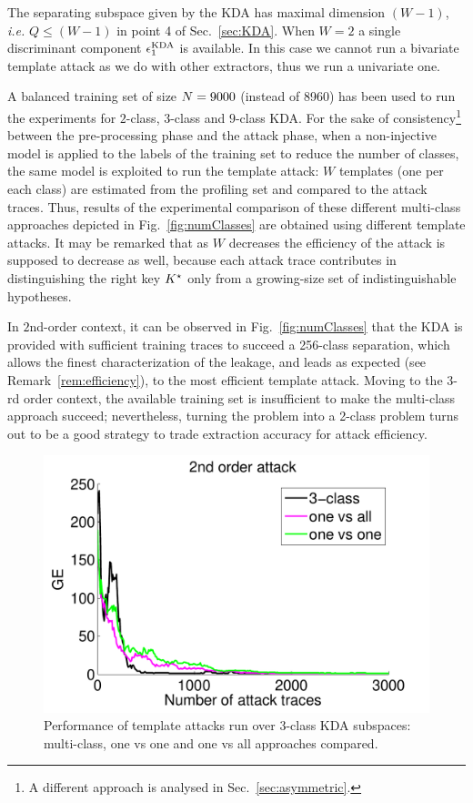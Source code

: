 \begin{remark}\label{rem:numComp}
The separating subspace given by the KDA has maximal dimension $(W-1)$, \emph{i.e.} $Q\leq (W-1)$ in point 4 of Sec.~\ref{sec:KDA}. When $W=2$ a single discriminant component $\epsilon^{\mathrm{KDA}}_1$ is available. In this case we cannot run a bivariate template attack as we do with other extractors, thus we run a univariate one. \\
\end{remark}


A balanced training set of size $N=9000$ (instead of 8960) has been used to run the experiments for $2$-class, $3$-class and $9$-class KDA. For the sake of consistency\footnote{A different approach is analysed in Sec.~\ref{sec:asymmetric}.} between the pre-processing phase and the attack phase, when a non-injective model is applied to the labels of the training set to reduce the number of classes, the same model is exploited to run the template attack: $W$ templates (one per each class) are estimated from the profiling set and compared to the attack traces. Thus, results of the experimental comparison of these different multi-class approaches depicted in  Fig.~\ref{fig:numClasses} are obtained using different template attacks. It may be remarked that as $W$ decreases the efficiency of the attack is supposed to decrease as well, because each attack trace contributes in distinguishing the right key $K^\star$ only from a growing-size set of indistinguishable hypotheses. 


 
In $2$nd-order context, it can be observed in Fig.~\ref{fig:numClasses} that the KDA is provided with sufficient training traces to succeed a 256-class separation, which allows the finest characterization of the leakage, and leads as expected (see Remark~\ref{rem:efficiency}), to the most efficient template attack. Moving to the $3$-rd order context, the available training set is insufficient to make the multi-class approach succeed; nevertheless, turning the problem into a 2-class problem turns out to be a good strategy to trade extraction accuracy for attack efficiency.






\begin{figure}
\centering
\includegraphics[width=.5\textwidth]{../Figures/CARDIS2016/2order_MULT.pdf}
\caption[KDA: comparison between multi-class, one vs one and one vs all approaches.]{Performance of template attacks run over 3-class KDA subspaces: multi-class, one vs one and one vs all approaches compared.}\label{fig:3multi-class}
\end{figure}


